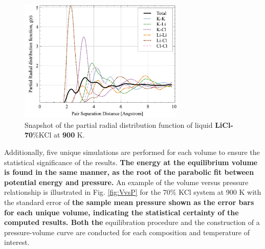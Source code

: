 \documentclass[review]{elsarticle}
\providecommand{\DIFaddtex}[1]{{\bf #1}} %
\providecommand{\DIFdeltex}[1]{} %
\providecommand{\DIFaddbegin}{\protect\color{blue}} %
\providecommand{\DIFaddend}{\protect\color{black}} %
\providecommand{\DIFdelbegin}{\protect\color{red}} %
\providecommand{\DIFdelend}{\protect\color{black}} %
\providecommand{\DIFaddFL}[1]{\DIFadd{#1}} %
\providecommand{\DIFdelFL}[1]{\DIFdel{#1}} %
\providecommand{\DIFaddbeginFL}{} %
\providecommand{\DIFaddendFL}{} %
\providecommand{\DIFdelbeginFL}{} %
\providecommand{\DIFdelendFL}{} %
\providecommand{\DIFadd}[1]{\texorpdfstring{\DIFaddtex{#1}}{#1}} %
\providecommand{\DIFdel}[1]{\texorpdfstring{\DIFdeltex{#1}}{}} %
\newcommand{\DIFscaledelfig}{0.5}
\newlength{\DIFdelgraphicswidth} %
\newlength{\DIFdelgraphicsheight} %
\newcommand{\DIFaddincludegraphics}[2][]{{\color{blue}\fbox{\DIFOincludegraphics[#1]{#2}}}} %
\newcommand{\DIFdelincludegraphics}[2][]{%
\sbox{\DIFdelgraphicsbox}{\DIFOincludegraphics[#1]{#2}}%
\settoboxwidth{\DIFdelgraphicswidth}{\DIFdelgraphicsbox} %
\settoboxtotalheight{\DIFdelgraphicsheight}{\DIFdelgraphicsbox} %
\scalebox{\DIFscaledelfig}{%
\parbox[b]{\DIFdelgraphicswidth}{\usebox{\DIFdelgraphicsbox}\\[-\baselineskip] \rule{\DIFdelgraphicswidth}{0em}}\llap{\resizebox{\DIFdelgraphicswidth}{\DIFdelgraphicsheight}{%
\setlength{\unitlength}{\DIFdelgraphicswidth}%
\begin{picture}(1,1)%
\thicklines\linethickness{2pt} %
{\color[rgb]{1,0,0}\put(0,0){\framebox(1,1){}}}%
{\color[rgb]{1,0,0}\put(0,0){\line( 1,1){1}}}%
{\color[rgb]{1,0,0}\put(0,1){\line(1,-1){1}}}%
\end{picture}%
}\hspace*{3pt}}} %
} %
\DeclareRobustCommand{\DIFaddbegin}{\DIFOaddbegin \let\includegraphics\DIFaddincludegraphics} %
\DeclareRobustCommand{\DIFaddend}{\DIFOaddend \let\includegraphics\DIFOincludegraphics} %
\DeclareRobustCommand{\DIFdelbegin}{\DIFOdelbegin \let\includegraphics\DIFdelincludegraphics} %
\DeclareRobustCommand{\DIFdelend}{\DIFOaddend \let\includegraphics\DIFOincludegraphics} %
\DeclareRobustCommand{\DIFaddbeginFL}{\DIFOaddbeginFL \let\includegraphics\DIFaddincludegraphics} %
\DeclareRobustCommand{\DIFaddendFL}{\DIFOaddendFL \let\includegraphics\DIFOincludegraphics} %
\DeclareRobustCommand{\DIFdelbeginFL}{\DIFOdelbeginFL \let\includegraphics\DIFdelincludegraphics} %
\DeclareRobustCommand{\DIFdelendFL}{\DIFOaddendFL \let\includegraphics\DIFOincludegraphics} %
\begin{document}
 \begin{figure}[h]
 \centering
 \DIFdelbeginFL %
\DIFdelendFL \DIFaddbeginFL \includegraphics[width=0.7\textwidth]{images/Partial_RDF.jpg} \DIFaddendFL \caption{Snapshot of the partial radial distribution function of liquid \DIFdelbeginFL \DIFdelFL{LiCl-30}\DIFdelendFL \DIFaddbeginFL \DIFaddFL{LiCl-70}\DIFaddendFL \%KCl at \DIFdelbeginFL \DIFdelFL{1300 }\DIFdelendFL \DIFaddbeginFL \DIFaddFL{900 }\DIFaddendFL K.}
 \label{fig:rdf}
 \end{figure}
 Additionally, five unique simulations are performed for each volume to ensure the statistical significance of the results. \DIFaddbegin \DIFadd{The energy at the equilibrium volume is found in the same manner, as the root of the parabolic fit between potential energy and pressure. }\DIFaddend An example of the volume versus pressure relationship is illustrated in Fig. \ref{fig:VvsP} for the 70\% KCl system at 900 K with the standard error of \DIFdelbegin \DIFdel{each data point included shown by error bars . Both this }\DIFdelend \DIFaddbegin \DIFadd{the sample mean pressure shown as the error bars for each unique volume, indicating the statistical certainty of the computed results. Both the }\DIFaddend equilibration procedure and the construction of a pressure-volume curve are conducted for each composition and temperature of interest.
\end{document}
